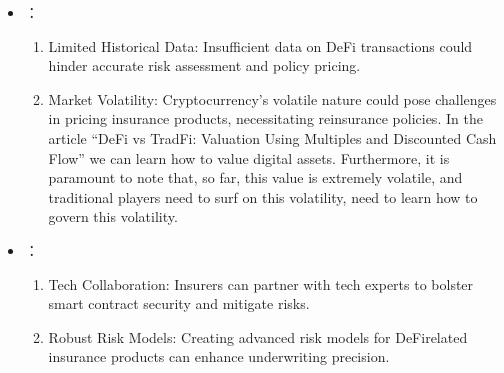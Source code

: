\documentclass[letterpaper,10pt,english]{jupyterBook}
\begin{document}
\begin{itemize}
\begin{enumerate}
\item {} 
\sphinxAtStartPar
Risk Assessment Services: Insurance companies can develop risk assessment services for PLF participants, aiding informed decision\sphinxhyphen{}making.

\end{enumerate}

\item {} 
\sphinxAtStartPar
{}：
\begin{enumerate}
%
\item {} 
\sphinxAtStartPar
Limited Historical Data: Insufficient data on DeFi transactions could hinder accurate risk assessment and policy pricing.

\item {} 
\sphinxAtStartPar
Market Volatility: Cryptocurrency’s volatile nature could pose challenges in pricing insurance products, necessitating reinsurance policies. In the article “DeFi vs TradFi: Valuation Using Multiples and Discounted Cash Flow” we can learn how to value digital assets. Furthermore, it is paramount to note that, so far, this value is extremely volatile, and traditional players need to surf on this volatility, need to learn how to govern this volatility.

\end{enumerate}

\item {} 
\sphinxAtStartPar
{}：
\begin{enumerate}
%
\item {} 
\sphinxAtStartPar
Tech Collaboration: Insurers can partner with tech experts to bolster smart contract security and mitigate risks.

\item {} 
\sphinxAtStartPar
Robust Risk Models: Creating advanced risk models for DeFi\sphinxhyphen{}related insurance products can enhance underwriting precision.

\end{enumerate}

\end{itemize}
\end{document}
